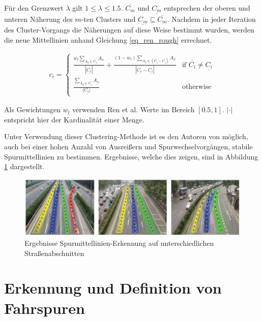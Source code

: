 Für den Grenzwert $\lambda$ gilt $1 \leq \lambda \leq 1.5$. $\overline{C_m}$ und $\underline{C_m}$ entsprechen der oberen und unteren
Näherung des $m$-ten Clusters und $\underline{C_m} \subseteq \overline{C_m}$.
Nachdem in jeder Iteration des Cluster-Vorgangs die Näherungen auf diese Weise bestimmt wurden, werden die neue Mittellinien
anhand Gleichung \ref{eq_ren_rough} errechnet.

\begin{ceqn}
\begin{align}
    \label{eq_ren_rough}
    c_i =
    \begin{cases}
        \frac{w_l \sum_{A_x \in \underline{C_i}} A_x}{|\underline{C_i}|} + \frac{(1 - w_l) \sum_{A_x \in (\overline{C_i} - \underline{C_i})} A_x}{|\overline{C_i} - \underline{C_i}|} & \text{if } \overline{C_i} \neq \underline{C_i} \\
        \frac{\sum_{A_x \in \underline{C_i}} A_x}{|\underline{C_i|}} & \text{otherwise}
    \end{cases}
\end{align}
\end{ceqn}

Als Gewichtungen $w_l$ verwenden Ren et al. Werte im Bereich $[0.5, 1]$. $| \cdot |$ entspricht hier der Kardinalität einer Menge.

Unter Verwendung dieser Clustering-Methode ist es den Autoren von \cite[]{Ren2014} möglich, auch bei einer hohen Anzahl von
Ausreißern und Spurwechselvorgängen, stabile Spurmittellinien zu bestimmen. Ergebnisse, welche dies zeigen, sind in Abbildung
\ref{fig:relw_ren_example_detection} dargestellt.

\begin{figure}[H]
    \centering
    \includegraphics[width=0.95\linewidth]{resources/img/RelatedWork/ren_examples_detection}
    \caption[Ergebnisse Spurmittellinien-Erkennung (Ren et al.)]{Ergebnisse Spurmittellinien-Erkennung auf unterschiedlichen Straßenabschnitten \cite[]{Ren2014}}
    \label{fig:relw_ren_example_detection}
\end{figure}


\section{Erkennung und Definition von Fahrspuren}
\label{sec:rw_lane_detection}

